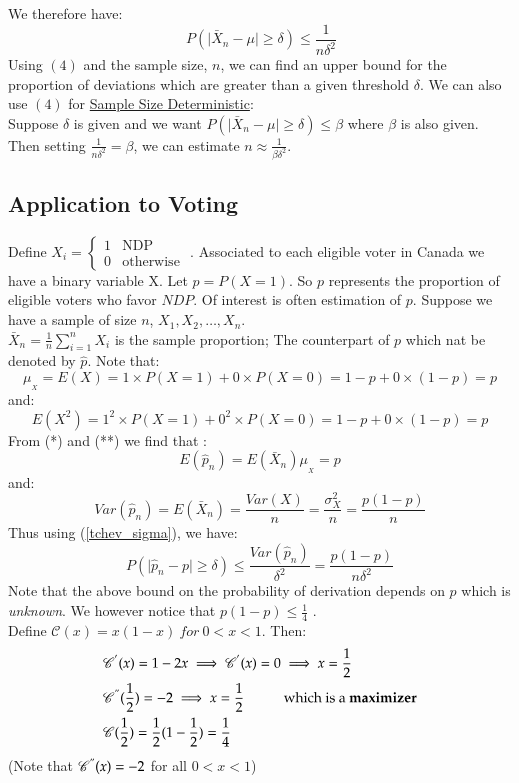 \documentclass[14pt,twoside,a4paper,fleqn]{article}
\theoremstyle{plain}
\begin{document}
We therefore have:
\begin{equation}\
P(\vert\bar{X}_n - \mu\vert \geq \delta) \leq \frac{1}{n\delta^2}
\end{equation}
Using $(4)$ and  the sample size, $n$, we can find an upper bound for the proportion of deviations which are greater than a given threshold $\delta$.\hfill\newline
We can also use $(4)$ for \underline{Sample Size Deterministic}:\\
Suppose $\delta$ is given and we want $P(\vert\bar{X}_n - \mu\vert \geq \delta) \leq \beta$ where $\beta$ is also given. Then setting $\frac{1}{n\delta^2} = \beta$, we can estimate $n\approx\frac{1}{\beta\delta^2}$.\hfill\newline
\subsection{Application to Voting}
Define $X_i = \begin{cases}
		1 & \text{NDP}\\
		0 & \text{otherwise}
		\end{cases}$ . Associated to each eligible voter in Canada we have a binary variable X. Let $p=P(X=1)$. So $p$ represents the proportion of eligible voters who favor $NDP$. Of interest is often estimation of $p$. Suppose we have a sample of size $n$, $X_1,X_2,\ldots,X_n$.\\
		$\bar{X}_n = \frac{1}{n}\sum_{i=1}^{n}X_i$ is the sample proportion; The counterpart of $p$ which nat be denoted by $\hat{p}$. Note that:
		$$\mu_{_X} = E(X) = 1 \times P(X=1) + 0\times P(X=0) = 1-p + 0\times (1-p)=p$$
		and:
		$$E(X^2) = 1^2 \times P(X=1) + 0^2 \times P(X=0) = 1-p + 0\times (1-p) = p$$
From (*) and (**) we find that :
	$$E(\hat{p}_n) = E(\bar{X}_n) \mu_{_X} = p$$
and:
	$$Var(\hat{p}_n) = E(\bar{X}_n) = \frac{Var(X)}{n} = \frac{\sigma_X^2}{n} = \frac{p(1-p)}{n}$$
Thus using (\ref{tchev_sigma}), we have:
$$P(\vert\hat{p}_n - p\vert \geq \delta) \leq \frac{Var(\hat{p}_n)}{\delta^2} = \frac{p(1-p)}{n\delta^2}$$
Note that the above bound on the probability of derivation depends on $p$ which is \emph{unknown}. We however notice that $p(1-p) \leq \frac{1}{4}$ .\\
Define $\mathscr{C}(x) = x(1-x)\ for\ 0 < x < 1$. Then:
	\begin{equation*}
	\begin{split}
	&\mathscr{C}^{'}(x) = 1-2x \implies \mathscr{C}^{'}(x)= 0 \implies x = \frac{1}{2} \\
	&\mathscr{C}^{"}(\frac{1}{2}) = -2 \implies x = \frac{1}{2}\hspace*{1cm} \text{which is a \textbf{maximizer}}\\
	&\mathscr{C}(\frac{1}{2}) = \frac{1}{2}(1-\frac{1}{2})=\frac{1}{4}
	\end{split}
	\end{equation*}
	(Note that $\mathscr{C}^{"}(x) = -2$ for all $0 < x < 1$)
	
\end{document}
